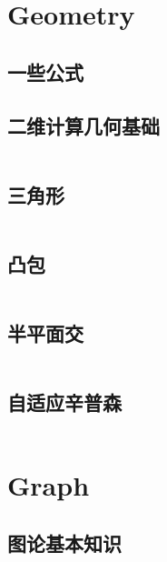 \documentclass[titlepage, a4paper]{article}
\begin{document}
	\begin{titlepage}
		
	\end{titlepage}
	\begin{multicols}{2}
		\setcounter{tocdepth}{3}
		\begingroup
		\let\cleardoublepage\relax
		\let\clearpage\relax
		\begin{small}
		\begin{spacing}{0.75}
		\tableofcontents
		\end{spacing}
		\end{small}
		\newpage
		\begin{spacing}{0.6}
			\section{Geometry}
				\subsection{一些公式}
					
				\subsection{二维计算几何基础}
					\inputminted{cpp}{src/Geometry/geo.cpp}
				\subsection{三角形}
					\inputminted{cpp}{src/Geometry/triangle.cpp}
				\subsection{凸包}
					\inputminted{cpp}{src/Geometry/凸包.cpp}
				\subsection{半平面交}
					\inputminted{cpp}{src/Geometry/半平面交.cpp}
				\subsection{自适应辛普森}
					\inputminted{cpp}{src/Geometry/simpson.cpp}
			\section{Graph}
				\subsection{图论基本知识}
					

\end{spacing}
\end{multicols}
\end{document}
